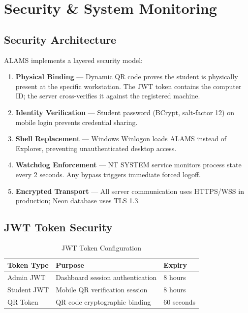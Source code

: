 \chapter{Security \& System Monitoring}
\label{ch:security}

\section{Security Architecture}

ALAMS implements a layered security model:

\begin{enumerate}[leftmargin=*, label=\textbf{Layer \arabic*:}]
  \item \textbf{Physical Binding} — Dynamic QR code proves the student is physically present at the specific workstation. The JWT token contains the computer ID; the server cross-verifies it against the registered machine.
  \item \textbf{Identity Verification} — Student password (BCrypt, salt-factor 12) on mobile login prevents credential sharing.
  \item \textbf{Shell Replacement} — Windows Winlogon loads ALAMS instead of Explorer, preventing unauthenticated desktop access.
  \item \textbf{Watchdog Enforcement} — NT SYSTEM service monitors process state every 2 seconds. Any bypass triggers immediate forced logoff.
  \item \textbf{Encrypted Transport} — All server communication uses HTTPS/WSS in production; Neon database uses TLS 1.3.
\end{enumerate}

\section{JWT Token Security}

\begin{table}[h!]
\centering
\caption{JWT Token Configuration}
\label{tab:jwt}
\begin{tabularx}{\textwidth}{lXl}
\toprule
\textbf{Token Type} & \textbf{Purpose} & \textbf{Expiry}\\
\midrule
\rowcolor{aurxonlightgray}
Admin JWT & Dashboard session authentication & 8 hours\\
Student JWT & Mobile QR verification session & 8 hours\\
\rowcolor{aurxonlightgray}
QR Token & QR code cryptographic binding & 60 seconds\\
\bottomrule
\end{tabularx}
\end{table}

